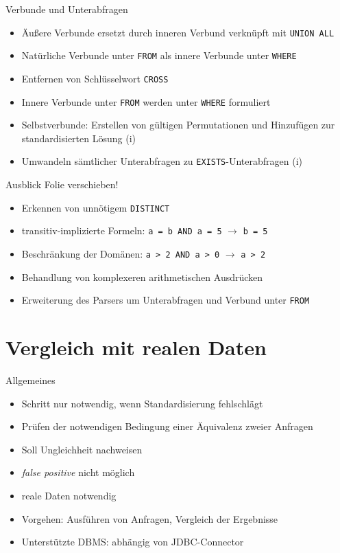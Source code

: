\documentclass{beamer}
\begin{document}
\begin{frame}[fragile]{Verbunde und Unterabfragen}
\begin{itemize}
\item Äußere Verbunde ersetzt durch inneren Verbund verknüpft mit \verb|UNION ALL|
\item Natürliche Verbunde unter \verb|FROM| als innere Verbunde unter \verb|WHERE|
\item Entfernen von Schlüsselwort \verb|CROSS|
\item Innere Verbunde unter \verb|FROM| werden unter \verb|WHERE| formuliert
\item Selbstverbunde: Erstellen von gültigen Permutationen und Hinzufügen zur standardisierten Lösung (i)
\item Umwandeln sämtlicher Unterabfragen zu \verb|EXISTS|-Unterabfragen (i)
\end{itemize}
\end{frame}

\begin{frame}[fragile]{Ausblick}
Folie verschieben!
\begin{itemize}
\item Erkennen von unnötigem \verb|DISTINCT|
\item transitiv-implizierte Formeln: \verb|a = b AND a = 5| $\to$ \verb|b = 5|
\item Beschränkung der Domänen: \verb|a > 2 AND a > 0| $\to$ \verb|a > 2|
\item Behandlung von komplexeren arithmetischen Ausdrücken
\item Erweiterung des Parsers um Unterabfragen und Verbund unter \verb|FROM|
\end{itemize}
\end{frame}

\section{Vergleich mit realen Daten}

\begin{frame}[fragile]{Allgemeines}
\begin{itemize}
\item Schritt nur notwendig, wenn Standardisierung fehlschlägt
\item Prüfen der notwendigen Bedingung einer Äquivalenz zweier Anfragen
\item Soll Ungleichheit nachweisen
\item \textit{false positive} nicht möglich
\item reale Daten notwendig
\item Vorgehen: Ausführen von Anfragen, Vergleich der Ergebnisse 
\item Unterstützte DBMS: abhängig von JDBC-Connector
\end{itemize}
\end{frame}
\end{document}
